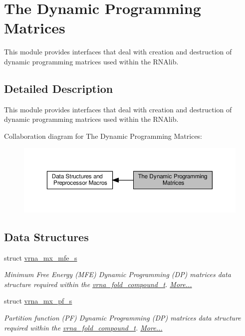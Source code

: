 \hypertarget{group__dp__matrices}{}\section{The Dynamic Programming Matrices}
\label{group__dp__matrices}


This module provides interfaces that deal with creation and destruction of dynamic programming matrices used within the R\+N\+Alib.  




\subsection{Detailed Description}
This module provides interfaces that deal with creation and destruction of dynamic programming matrices used within the R\+N\+Alib. 

Collaboration diagram for The Dynamic Programming Matrices\+:
\nopagebreak
\begin{figure}[H]
\begin{center}
\leavevmode
\includegraphics[width=350pt]{group__dp__matrices}
\end{center}
\end{figure}
\subsection*{Data Structures}
\begin{DoxyCompactItemize}
\item 
struct \hyperlink{group__dp__matrices_structvrna__mx__mfe__s}{vrna\+\_\+mx\+\_\+mfe\+\_\+s}
\begin{DoxyCompactList}\small\item\em Minimum Free Energy (M\+FE) Dynamic Programming (DP) matrices data structure required within the \hyperlink{group__fold__compound_ga1b0cef17fd40466cef5968eaeeff6166}{vrna\+\_\+fold\+\_\+compound\+\_\+t}.  \hyperlink{group__dp__matrices_structvrna__mx__mfe__s}{More...}\end{DoxyCompactList}\item 
struct \hyperlink{group__dp__matrices_structvrna__mx__pf__s}{vrna\+\_\+mx\+\_\+pf\+\_\+s}
\begin{DoxyCompactList}\small\item\em Partition function (PF) Dynamic Programming (DP) matrices data structure required within the \hyperlink{group__fold__compound_ga1b0cef17fd40466cef5968eaeeff6166}{vrna\+\_\+fold\+\_\+compound\+\_\+t}.  \hyperlink{group__dp__matrices_structvrna__mx__pf__s}{More...}\end{DoxyCompactList}\end{DoxyCompactItemize}
